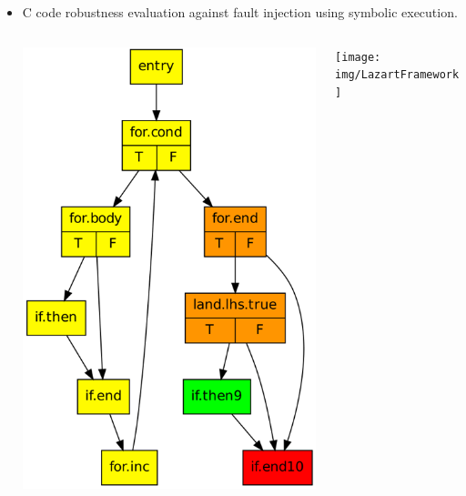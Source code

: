 \documentclass[final]{beamer}
\begin{document}
\begin{frame}[fragile]{}
\begin{tcolorbox}[adjusted title={\centering \Large Fault simulators}]
    \begin{columns}[t]
    \begin{column}{0.31\linewidth}
    \begin{tcolorbox}[
    colback=white, %
    colframe=normalTitleBlockColor, %
    colframe=gray!20, %
    boxrule=1mm,
    coltext=black, %
    coltitle=black, %
    bottom=2mm,
    equal height group=A,
    valign = center,
    adjusted title={\large Lazart \normalsize (by VERIMAG)}]
\begin{itemize}
\item C code robustness evaluation against fault injection using symbolic
execution.
	\vspace{1cm}
    \begin{columns}
    \begin{column}{0.40\textwidth}
    \centering \includegraphics{img/colored_cfg}
    \end{column}
    \begin{column}{0.60\textwidth}
    \centering \texttt{[image: img/LazartFramework]}
    \end{column}
    \end{columns}
	\vspace{1cm}
    

\end{itemize}
\end{tcolorbox}
\end{column}
\end{columns}
\end{tcolorbox}
\end{frame}
\end{document}
